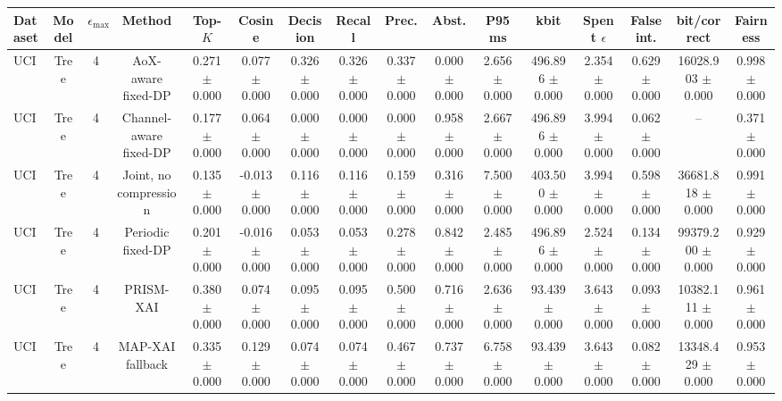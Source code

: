 \begin{tabular}{lccccccccccccccc}
\toprule
Dataset & Model & $\epsilon_{\max}$ & Method & Top-$K$ & Cosine & Decision & Recall & Prec. & Abst. & P95 ms & kbit & Spent $\epsilon$ & False int. & bit/correct & Fairness \\
\midrule
UCI & Tree & 4 & AoX-aware fixed-DP & 0.271 $\pm$ 0.000 & 0.077 $\pm$ 0.000 & 0.326 $\pm$ 0.000 & 0.326 $\pm$ 0.000 & 0.337 $\pm$ 0.000 & 0.000 $\pm$ 0.000 & 2.656 $\pm$ 0.000 & 496.896 $\pm$ 0.000 & 2.354 $\pm$ 0.000 & 0.629 $\pm$ 0.000 & 16028.903 $\pm$ 0.000 & 0.998 $\pm$ 0.000 \\
UCI & Tree & 4 & Channel-aware fixed-DP & 0.177 $\pm$ 0.000 & 0.064 $\pm$ 0.000 & 0.000 $\pm$ 0.000 & 0.000 $\pm$ 0.000 & 0.000 $\pm$ 0.000 & 0.958 $\pm$ 0.000 & 2.667 $\pm$ 0.000 & 496.896 $\pm$ 0.000 & 3.994 $\pm$ 0.000 & 0.062 $\pm$ 0.000 & -- & 0.371 $\pm$ 0.000 \\
UCI & Tree & 4 & Joint, no compression & 0.135 $\pm$ 0.000 & -0.013 $\pm$ 0.000 & 0.116 $\pm$ 0.000 & 0.116 $\pm$ 0.000 & 0.159 $\pm$ 0.000 & 0.316 $\pm$ 0.000 & 7.500 $\pm$ 0.000 & 403.500 $\pm$ 0.000 & 3.994 $\pm$ 0.000 & 0.598 $\pm$ 0.000 & 36681.818 $\pm$ 0.000 & 0.991 $\pm$ 0.000 \\
UCI & Tree & 4 & Periodic fixed-DP & 0.201 $\pm$ 0.000 & -0.016 $\pm$ 0.000 & 0.053 $\pm$ 0.000 & 0.053 $\pm$ 0.000 & 0.278 $\pm$ 0.000 & 0.842 $\pm$ 0.000 & 2.485 $\pm$ 0.000 & 496.896 $\pm$ 0.000 & 2.524 $\pm$ 0.000 & 0.134 $\pm$ 0.000 & 99379.200 $\pm$ 0.000 & 0.929 $\pm$ 0.000 \\
UCI & Tree & 4 & PRISM-XAI & 0.380 $\pm$ 0.000 & 0.074 $\pm$ 0.000 & 0.095 $\pm$ 0.000 & 0.095 $\pm$ 0.000 & 0.500 $\pm$ 0.000 & 0.716 $\pm$ 0.000 & 2.636 $\pm$ 0.000 & 93.439 $\pm$ 0.000 & 3.643 $\pm$ 0.000 & 0.093 $\pm$ 0.000 & 10382.111 $\pm$ 0.000 & 0.961 $\pm$ 0.000 \\
UCI & Tree & 4 & MAP-XAI fallback & 0.335 $\pm$ 0.000 & 0.129 $\pm$ 0.000 & 0.074 $\pm$ 0.000 & 0.074 $\pm$ 0.000 & 0.467 $\pm$ 0.000 & 0.737 $\pm$ 0.000 & 6.758 $\pm$ 0.000 & 93.439 $\pm$ 0.000 & 3.643 $\pm$ 0.000 & 0.082 $\pm$ 0.000 & 13348.429 $\pm$ 0.000 & 0.953 $\pm$ 0.000 \\
\bottomrule
\end{tabular}
